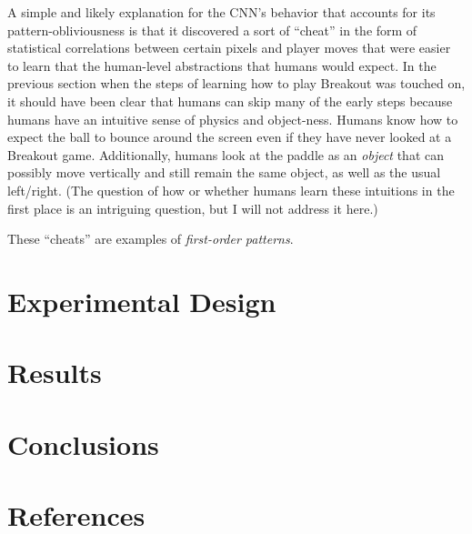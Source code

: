 \documentclass{article}
\begin{document}
A simple and likely explanation for the CNN's behavior that accounts for its pattern-obliviousness is that it discovered a sort of ``cheat'' in the form of statistical correlations between certain pixels and player moves that were easier to learn that the human-level abstractions that humans would expect.
In the previous section when the steps of learning how to play Breakout was touched on, it should have been clear that humans can skip many of the early steps because humans have an intuitive sense of physics and object-ness. Humans know how to expect the ball to bounce around the screen even if they have never looked at a Breakout game. Additionally, humans look at the paddle as an \textit{object} that can possibly move vertically and still remain the same object, as well as the usual left/right. (The question of how or whether humans learn these intuitions in the first place is an intriguing question, but I will not address it here.)

These ``cheats'' are examples of \textit{first-order patterns}.



\section{Experimental Design}

\section{Results}

\section{Conclusions}

\section*{References}
\end{document}
